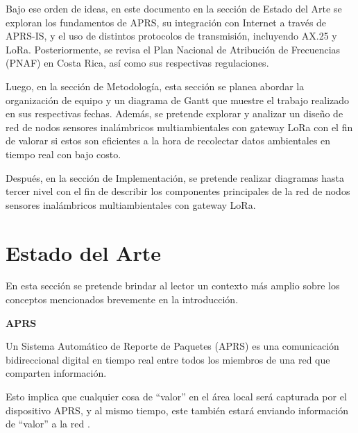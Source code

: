 \documentclass[conference]{IEEEtran}
\begin{document}
\vspace{2mm}

Bajo ese orden de ideas, en este documento en la sección de Estado del Arte se exploran los fundamentos de APRS, su integración con Internet a través de APRS-IS, y el uso de distintos protocolos de transmisión, incluyendo AX.25 y LoRa. Posteriormente, se revisa el Plan Nacional de Atribución de Frecuencias (PNAF) en Costa Rica, así como sus respectivas regulaciones.

\vspace{2mm}

Luego, en la sección de Metodología, esta sección se planea abordar la organización de equipo y un diagrama de Gantt que muestre el trabajo realizado en sus respectivas fechas. Además, se pretende explorar y analizar un diseño de red de nodos sensores inalámbricos multiambientales con gateway LoRa con el fin de valorar si estos son eficientes a la hora de recolectar datos ambientales en tiempo real con bajo costo.  

\vspace{2mm}

Después, en la sección de Implementación, se pretende realizar diagramas hasta tercer nivel con el fin de describir los componentes principales de la red de nodos sensores inalámbricos multiambientales con gateway LoRa.


\section{\textbf{Estado del Arte}}

En esta sección se pretende brindar al lector un contexto más amplio sobre los conceptos mencionados brevemente en la introducción.

\vspace{2mm}

\begin{center}
\textbf{\large APRS}
\end{center}

Un Sistema Automático de Reporte de Paquetes (APRS) es una comunicación bidireccional digital en tiempo real entre todos los miembros de una red que comparten información. 

\newpage

Esto implica que cualquier cosa de ``valor'' en el área local será capturada por el dispositivo APRS, y al mismo tiempo, este también estará enviando información de ``valor'' a la red \cite{APRS}. 

\vspace{2mm}
\end{document}

